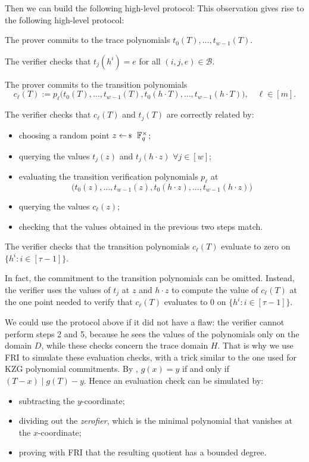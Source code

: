 \documentclass[../../book]{subfiles}
\begin{document}
Then we can build the following high-level protocol:
This observation gives rise to the following high-level protocol:
\begin{algoen}
  \item The prover commits to the trace polynomials $t_0(T), \ldots, t_{w-1}(T)$.
  \item The verifier checks that $t_j(h^i) = e$ for all $(i,j,e) \in \mathcal{B}$.
  \item The prover commits to the transition polynomials
  \begin{equation*}
    c_\ell(T) := p_\ell\big(t_0(T), \ldots, t_{w-1}(T), t_0(h \cdot T), \ldots, t_{w-1}(h \cdot T)\big),
    \quad \ell \in [m].
  \end{equation*}
  \item The verifier checks that $c_\ell(T)$ and $t_j(T)$ are correctly related by:
  \begin{itemize}
    \item choosing a random point $z \leftarrowS \mathbb{F}_q^{\times}$;
    \item querying the values $t_j(z)$ and $t_j(h \cdot z)$ $\forall j \in [w]$;
    \item evaluating the transition verification polynomials $p_\ell$ at
    \begin{equation*}
      \big(t_0(z), \ldots, t_{w-1}(z), t_0(h \cdot z), \ldots, t_{w-1}(h \cdot z)\big)
    \end{equation*}
    \item querying the values $c_\ell(z)$;
    \item checking that the values obtained in the previous two steps match.
  \end{itemize}
  \item The verifier checks that the transition polynomials $c_\ell(T)$ evaluate to zero on
  $\{h^i : i \in [\tau-1]\}$.
\end{algoen}

In fact, the commitment to the transition polynomials can be omitted. Instead, the verifier uses
the values of $t_j$ at $z$ and $h \cdot z$ to compute the value of $c_\ell(T)$ at the one point
needed to verify that $c_\ell(T)$ evaluates to $0$ on $\{h^i : i \in [\tau-1]\}$.

We could use the protocol above if it did not have a flaw: the verifier cannot perform steps 2 and 5, because he sees the values of the polynomials only on the domain $D$, while these checks concern the trace domain $H$. That is why we use FRI to simulate these evaluation checks, with a trick similar to the one used for KZG polynomial commitments. By , $g(x) = y$ if and only if $(T - x) \mid g(T) - y$. Hence an evaluation check can be simulated by:
\begin{itemize}
  \item subtracting the $y$-coordinate;
  \item dividing out the \emph{zerofier}, which is the minimal polynomial that vanishes at the $x$-coordinate;
  \item proving with FRI that the resulting quotient has a bounded degree.
\end{itemize}
\end{document}
